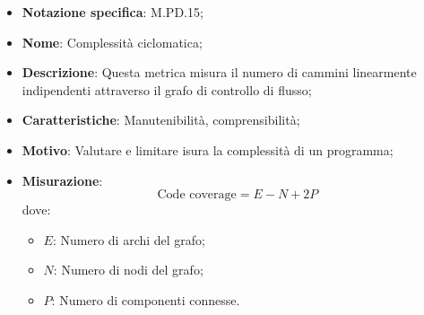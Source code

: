 \begin{itemize}
    \item \textbf{Notazione specifica}: M.PD.15;
    \item \textbf{Nome}: Complessità ciclomatica;
    \item \textbf{Descrizione}: Questa metrica misura il numero di cammini linearmente indipendenti attraverso il grafo di controllo di flusso;
    \item \textbf{Caratteristiche}: Manutenibilità, comprensibilità;
    \item \textbf{Motivo}: Valutare e limitare isura la complessità di un programma;
    \item \textbf{Misurazione}: 
    \[
    \text{Code coverage} = \textit{E} - \textit{N} + \textit{2P}
    \]
    dove:
    \begin{itemize}
        \item $E$: Numero di archi del grafo;
        \item $N$: Numero di nodi del grafo;
        \item $P$: Numero di componenti connesse.
    \end{itemize}
\end{itemize}
